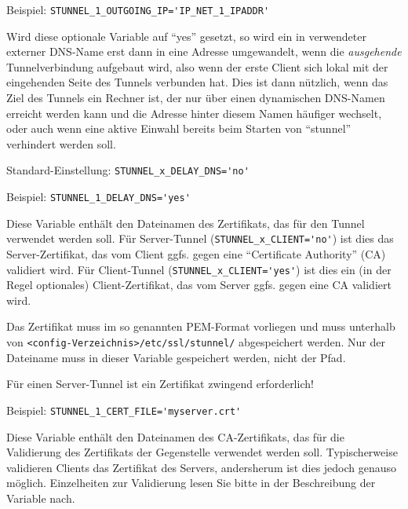 \begin{description}
Beispiel: \verb+STUNNEL_1_OUTGOING_IP='IP_NET_1_IPADDR'+


Wird diese optionale Variable auf ``yes'' gesetzt, so wird ein in
 verwendeter externer DNS-Name erst dann in eine
Adresse umgewandelt, wenn die \emph{ausgehende} Tunnelverbindung aufgebaut wird,
also wenn der erste Client sich lokal mit der eingehenden Seite des Tunnels
verbunden hat. Dies ist dann nützlich, wenn das Ziel des Tunnels ein Rechner
ist, der nur über einen dynamischen DNS-Namen erreicht werden kann und die
Adresse hinter diesem Namen häufiger wechselt, oder auch wenn eine aktive
Einwahl bereits beim Starten von ``stunnel'' verhindert werden soll.

Standard-Einstellung: \verb+STUNNEL_x_DELAY_DNS='no'+

Beispiel: \verb+STUNNEL_1_DELAY_DNS='yes'+


Diese Variable enthält den Dateinamen des Zertifikats, das für den
Tunnel verwendet werden soll. Für Server-Tunnel (\verb+STUNNEL_x_CLIENT='no'+)
ist dies das Server-Zertifikat, das vom Client ggfs. gegen eine ``Certificate
Authority'' (CA) validiert wird. Für Client-Tunnel
(\verb+STUNNEL_x_CLIENT='yes'+) ist dies ein (in der Regel optionales)
Client-Zertifikat, das vom Server ggfs. gegen eine CA validiert wird.

Das Zertifikat muss im so genannten PEM-Format vorliegen und muss unterhalb von
\texttt{<config-Verzeichnis>/etc/ssl/stunnel/} abgespeichert werden. Nur
der Dateiname muss in dieser Variable gespeichert werden, nicht der Pfad.

Für einen Server-Tunnel ist ein Zertifikat zwingend erforderlich!

Beispiel: \verb+STUNNEL_1_CERT_FILE='myserver.crt'+


Diese Variable enthält den Dateinamen des CA-Zertifikats, das für die
Validierung des Zertifikats der Gegenstelle verwendet werden soll.
Typischerweise validieren Clients das Zertifikat des Servers, andersherum ist
dies jedoch genauso möglich. Einzelheiten zur Validierung lesen Sie bitte in
der Beschreibung der Variable 
{} nach.


\end{description}
